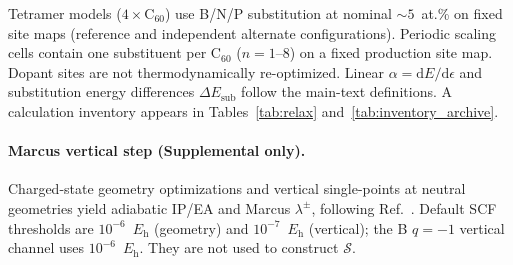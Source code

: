 Tetramer models ($4\times\mathrm{C}_{60}$) use B/N/P substitution at nominal ${\sim}5$~at.\% on fixed site maps (reference and independent alternate configurations).
Periodic scaling cells contain one substituent per C$_{60}$ ($n=1$--$8$) on a fixed production site map.
Dopant sites are not thermodynamically re-optimized.
Linear $\alpha=\mathrm{d}E/\mathrm{d}\epsilon$ and substitution energy differences $\Delta E_{\mathrm{sub}}$ follow the main-text definitions.
A calculation inventory appears in Tables~\ref{tab:relax} and~\ref{tab:inventory_archive}.

\paragraph{Marcus vertical step (Supplemental only).}
Charged-state geometry optimizations and vertical single-points at neutral geometries yield adiabatic IP/EA and Marcus $\lambda^{\pm}$, following Ref.~.
Default SCF thresholds are $10^{-6}$~$E_{\mathrm{h}}$ (geometry) and $10^{-7}$~$E_{\mathrm{h}}$ (vertical); the B $q=-1$ vertical channel uses $10^{-6}$~$E_{\mathrm{h}}$.
They are not used to construct $\mathcal{S}$.


